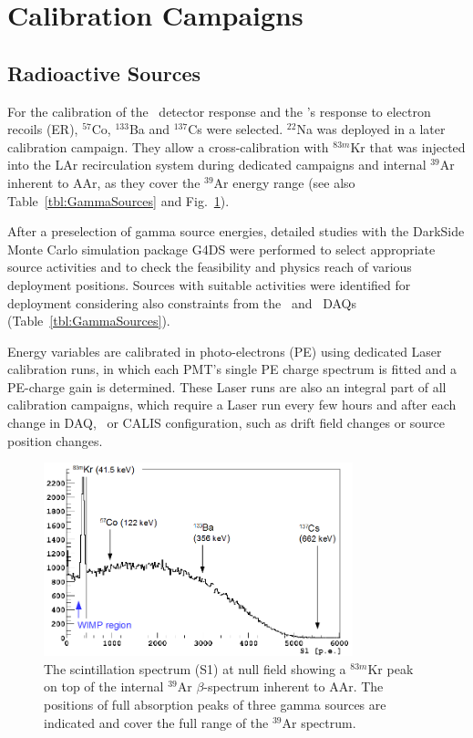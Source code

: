 \section{Calibration Campaigns}\label{sec:CalibCampaigns}
\subsection{Radioactive Sources}
For the calibration of the \lsv\ detector response and the \tpc's response to electron recoils (ER), $^{57}$Co, $^{133}$Ba and $^{137}$Cs were selected. $^{22}$Na was deployed in a later calibration campaign. They allow a cross-calibration with $^{83m}$Kr that was injected into the LAr recirculation system during dedicated campaigns and internal $^{39}$Ar inherent to AAr, as they cover the $^{39}$Ar energy range (see also Table~\ref{tbl:GammaSources} and Fig.~\ref{fig:GammaSources_Ar39spectrum}). %

After a preselection of gamma source energies, detailed studies with the DarkSide Monte Carlo simulation package G4DS \cite{DS50:G4DS:paper} were performed to select appropriate source activities and to check the feasibility and physics reach of various deployment positions. Sources with suitable activities were identified for deployment considering also constraints from the \lsv\ and \tpc\ DAQs (Table~\ref{tbl:GammaSources}).

Energy variables are calibrated in photo-electrons (PE) using dedicated Laser calibration runs, in which each PMT's single PE charge spectrum is fitted and a PE-charge gain is determined. 
These Laser runs are also an integral part of all calibration campaigns, which require a Laser run every few hours and after each change in DAQ, \tpc\ or CALIS configuration, such as drift field changes or source position changes.

\begin{figure}[htbp]
 \centering
 \includegraphics[width=0.8\textwidth]{Figures/GammaSources_Ar39spectrum.png}
 \caption{The scintillation spectrum (S1) at null field showing a $^{83m}$Kr peak on top of the internal $^{39}$Ar $\beta$-spectrum inherent to AAr. The positions of full absorption peaks of three gamma sources are indicated and cover the full range of the $^{39}$Ar spectrum.
\label{fig:GammaSources_Ar39spectrum}}
\end{figure}

